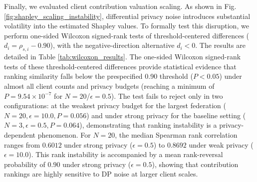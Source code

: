 \documentclass[conference]{IEEEtran}
\begin{document}
Finally, we evaluated client contribution valuation scaling. As shown in Fig. \ref{fig:shapley_scaling_instability}, differential privacy noise introduces substantial volatility into the estimated Shapley values. To formally test this disruption, we perform one-sided Wilcoxon signed-rank tests of threshold-centered differences ($d_i = \rho_{s,i} - 0.90$), with the negative-direction alternative $d_i < 0$. The results are detailed in Table \ref{tab:wilcoxon_results}. The one-sided Wilcoxon signed-rank tests of these threshold-centered differences provide statistical evidence that ranking similarity falls below the prespecified 0.90 threshold ($P < 0.05$) under almost all client counts and privacy budgets (reaching a minimum of $P = 9.54 \times 10^{-7}$ for $N=20$/$\epsilon=0.5$). The test fails to reject only in two configurations: at the weakest privacy budget for the largest federation ($N=20, \epsilon=10.0, P=0.056$) and under strong privacy for the baseline setting ($N=3, \epsilon=0.5, P=0.064$), demonstrating that ranking instability is a privacy-dependent phenomenon. For $N=20$, the median Spearman rank correlation ranges from $0.6012$ under strong privacy ($\epsilon=0.5$) to $0.8692$ under weak privacy ($\epsilon=10.0$). This rank instability is accompanied by a mean rank-reversal probability of $0.90$ under strong privacy ($\epsilon=0.5$), showing that contribution rankings are highly sensitive to DP noise at larger client scales.
\end{document}
